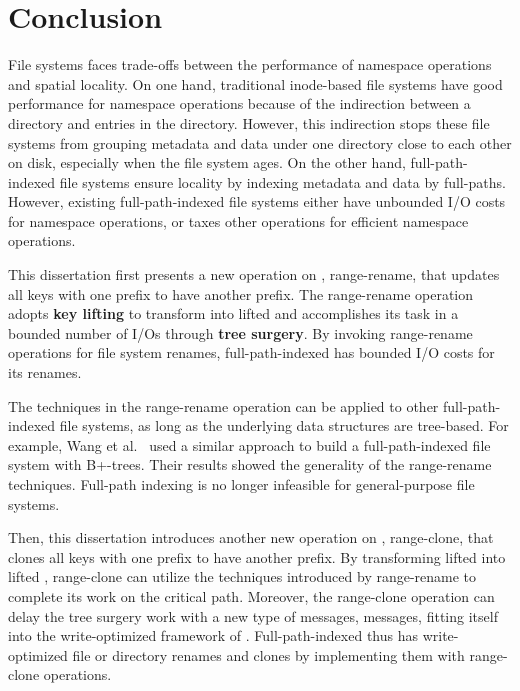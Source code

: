 \chapter{Conclusion}
\label{chap:conclusion}

File systems faces trade-offs between the performance of namespace
operations and spatial locality.
On one hand,
traditional inode-based file systems have good performance for namespace
operations because of the indirection between a directory and entries in the
directory.
However, this indirection stops these file systems from grouping metadata and data
under one directory close to each other on disk,
especially when the file system ages.
On the other hand, full-path-indexed file systems ensure locality by indexing
metadata and data by full-paths.
However, existing full-path-indexed file systems either have unbounded I/O costs for
namespace operations, or taxes other operations for efficient namespace operations.

This dissertation first presents a new operation on \bets, range-rename,
that updates all keys with one prefix to have another prefix.
The range-rename operation adopts \textbf{key lifting} to transform \bets into
lifted \bets
and accomplishes its task in a bounded number of I/Os through
\textbf{tree surgery}.
By invoking range-rename operations for file system renames,
full-path-indexed \betrfs has bounded I/O costs for its renames.

The techniques in the range-rename operation can be applied to other
full-path-indexed file systems, as long as the underlying data structures are
tree-based.
For example, Wang et al.~\cite{fpibt} used a similar approach to build a
full-path-indexed file system with B+-trees.
Their results showed the generality of the range-rename techniques.
Full-path indexing is no longer infeasible for general-purpose file systems.

Then, this dissertation introduces another new operation on \bets, range-clone,
that clones all keys with one prefix to have another prefix.
By transforming lifted \bets into lifted \bedags, range-clone can utilize
the techniques introduced by range-rename to complete its work on the critical path.
Moreover, the range-clone operation can delay the tree surgery work with a new
type of messages, \goto messages, fitting itself into the write-optimized
framework of \bedags.
Full-path-indexed \betrfs thus has write-optimized file or directory renames and
clones by implementing them with range-clone operations.

